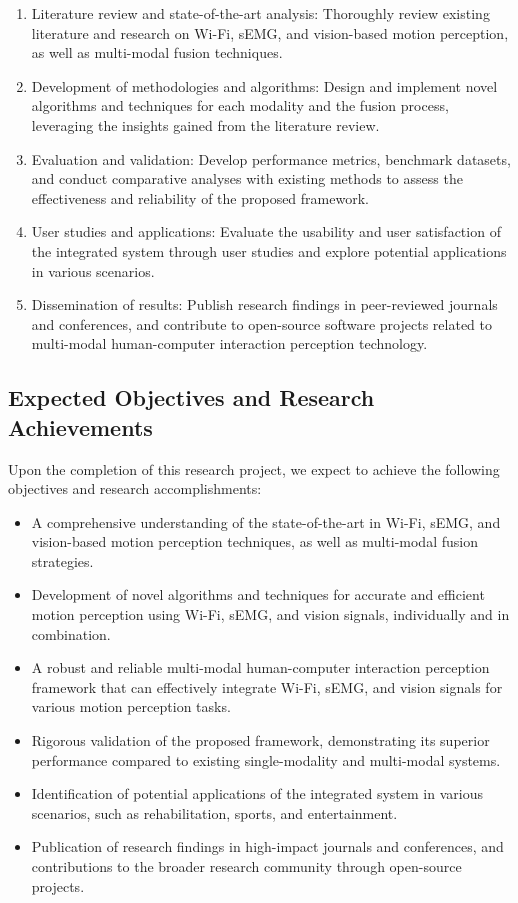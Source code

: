 \documentclass[12pt, a4paper]{article}
\begin{document}
\begin{enumerate}
	\item Literature review and state-of-the-art analysis: Thoroughly review existing literature and research on Wi-Fi, sEMG, and vision-based motion perception, as well as multi-modal fusion techniques.
	\item Development of methodologies and algorithms: Design and implement novel algorithms and techniques for each modality and the fusion process, leveraging the insights gained from the literature review.
	\item Evaluation and validation: Develop performance metrics, benchmark datasets, and conduct comparative analyses with existing methods to assess the effectiveness and reliability of the proposed framework.
	\item User studies and applications: Evaluate the usability and user satisfaction of the integrated system through user studies and explore potential applications in various scenarios.
	\item Dissemination of results: Publish research findings in peer-reviewed journals and conferences, and contribute to open-source software projects related to multi-modal human-computer interaction perception technology.
\end{enumerate}

\subsection{Expected Objectives and Research Achievements}

Upon the completion of this research project, we expect to achieve the following objectives and research accomplishments:

\begin{itemize}
	\item A comprehensive understanding of the state-of-the-art in Wi-Fi, sEMG, and vision-based motion perception techniques, as well as multi-modal fusion strategies.
	\item Development of novel algorithms and techniques for accurate and efficient motion perception using Wi-Fi, sEMG, and vision signals, individually and in combination.
	\item A robust and reliable multi-modal human-computer interaction perception framework that can effectively integrate Wi-Fi, sEMG, and vision signals for various motion perception tasks.
	\item Rigorous validation of the proposed framework, demonstrating its superior performance compared to existing single-modality and multi-modal systems.
	\item Identification of potential applications of the integrated system in various scenarios, such as rehabilitation, sports, and entertainment.
	\item Publication of research findings in high-impact journals and conferences, and contributions to the broader research community through open-source projects.
\end{itemize}
\end{document}
